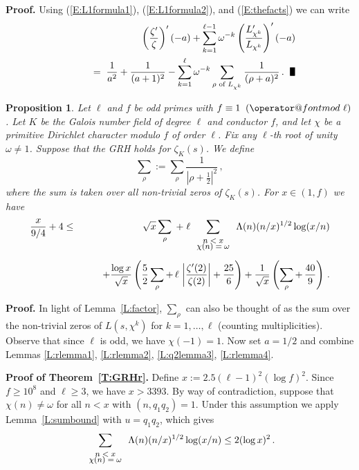 \documentclass{amsart}
\newtheorem{proposition}[theorem]{Proposition}
\numberwithin{equation}{section}
\numberwithin{table}{section}
\begin{document}
\noindent\textbf{Proof.}
Using (\ref{E:L1formula1}), (\ref{E:L1formula2}), and (\ref{E:thefacts}) we can write
\begin{eqnarray*}
  &&
  \left(\frac{\zeta'}{\zeta}\right)'(-a)
  +
  \sum_{k=1}^{\ell-1}
  \omega^{-k}
    \left(\frac{L_{\chi^k}'}{L_{\chi^k}}\right)'(-a)
    \\
    &&\qquad
    =\;
        \frac{1}{a^2}
  +
  \frac{1}{(a+1)^2}
    -\sum_{k=1}^\ell
    \omega^{-k}
    \sum_{\rho\text{ of $L_{\chi^k}$}}
      \frac{1}{(\rho+a)^2}
  \,.
  \;\;
  \text{\raisebox{-.25ex}{\scalebox{.786}[1.272]{$\blacksquare$}}}
\end{eqnarray*}

\begin{proposition}\label{P:explicit}
Let $\ell$ and $f$ be odd primes with $f\equiv 1{\allowbreak\mkern10mu({\operator@font mod}\,\,{\ell})}$.
 Let $K$ be the Galois number field of degree $\ell$ and conductor $f$,
and let $\chi$ be a primitive Dirichlet character modulo $f$ of order $\ell$.
Fix any $\ell$-th root of unity $\omega\neq 1$.
Suppose that the GRH holds for $\zeta_K(s)$.
We define
$$
  \sum_\rho:=\sum_\rho
  \frac{1}{\left|\rho+\frac{1}{2}\right|^2}
  \,,
$$
where the sum is taken over all non-trivial zeros of $\zeta_K(s)$.
For $x\in(1,f)$ we have
\begin{eqnarray*}
\frac{x}{9/4}+4
&\leq&
\sqrt{x}\sum_\rho
\;+\;
\ell
\sum_{\footnotesize{\begin{array}{cc}n<x\\[-1ex]\chi(n)=\omega\end{array}}}
\Lambda(n)(n/x)^{1/2}\log(x/n)
\\[1ex]
&&
\qquad
+
\frac{\log x}{\sqrt{x}}
\left(
\frac{5}{2}
\sum_\rho
+
\,
\ell
\,
\left|\frac{\zeta'(2)}{\zeta(2)}\right|
+
\frac{25}{6}
\right)
+
\frac{1}{\sqrt{x}}
\left(
\sum_\rho
+\,
\frac{40}{9}
\right)
\,.
\end{eqnarray*}

\end{proposition}

\noindent\textbf{Proof.}
In light of Lemma~\ref{L:factor},
$\sum_\rho$ can also be thought of as the sum
over the non-trivial zeros of $L(s,\chi^k)$ for $k=1,\dots,\ell$
(counting multiplicities).
Observe that since $\ell$ is odd, we have $\chi(-1)=1$.
Now set $a=1/2$ and combine Lemmas
\ref{L:rlemma1}, \ref{L:rlemma2}, \ref{L:q2lemma3}, \ref{L:rlemma4}.
{\raisebox{-.25ex}{\scalebox{.786}[1.272]{$\blacksquare$}}}

\vspace{1ex}
\noindent\textbf{Proof of Theorem~\ref{T:GRHr}.}
Define $x:=2.5(\ell-1)^2(\log f)^2$.
Since $f\geq 10^8$ and $\ell\geq 3$, we have $x>3393$.
By way of contradiction,
suppose that $\chi(n)\neq\omega$ for all $n<x$ with $(n, q_1 q_2)=1$.
Under this assumption we apply
Lemma~\ref{L:sumbound} with $u=q_1 q_2$, which gives
$$
  \sum_{\footnotesize{\begin{array}{cc}n<x\\[-1ex]\chi(n)=\omega\end{array}}}
  \Lambda(n)(n/x)^{1/2}\log(x/n)
  \leq 2(\log x)^2
\,.
$$
\end{document}
